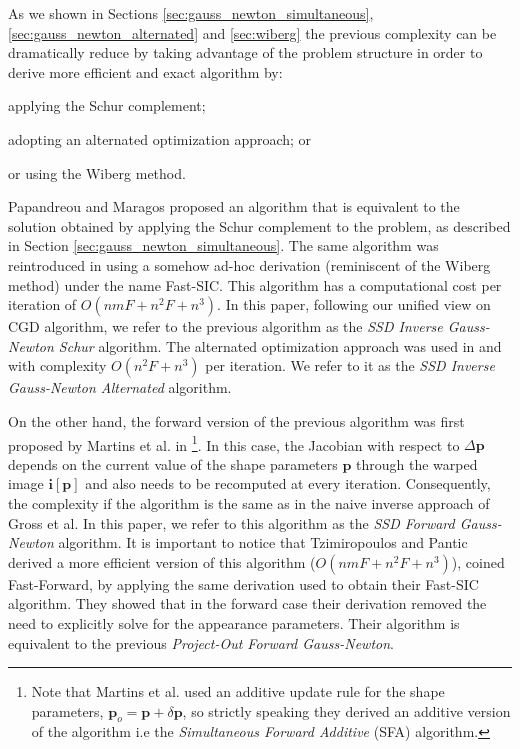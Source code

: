 As we shown in Sections \ref{sec:gauss_newton_simultaneous}, \ref{sec:gauss_newton_alternated} and \ref{sec:wiberg} the previous complexity can be dramatically reduce by taking advantage of the problem structure in order to derive more efficient and exact algorithm by:
\begin{inparaenum}
\item applying the Schur complement;
\item adopting an alternated optimization approach; or
\item or using the Wiberg method.
\end{inparaenum}
Papandreou and Maragos \cite{Papandreou2008} proposed an algorithm that is equivalent to the solution obtained by applying the Schur complement to the problem, as described in Section \ref{sec:gauss_newton_simultaneous}. The same algorithm was reintroduced in \cite{Tzimiropoulos2013} using a somehow ad-hoc derivation (reminiscent of the Wiberg method) under the name Fast-SIC. This algorithm has a computational cost per iteration of $O(nmF + n^2F + n^3)$. In this paper, following our unified view on CGD algorithm, we refer to the previous algorithm as the \emph{SSD Inverse Gauss-Newton Schur} algorithm. The alternated optimization approach was used in \cite{Tzimiropoulos2012} and \cite{Antonakos2014} with complexity $O(n^2F + n^3)$ per iteration. We refer to it as the \emph{SSD Inverse Gauss-Newton Alternated} algorithm.

On the other hand, the forward version of the previous algorithm was first proposed by Martins et al. in \cite{Martins2010}\footnote{Note that Martins et al.  used an additive update rule for the shape parameters, $\mathbf{p}_o =  \mathbf{p} + \delta\mathbf{p}$, so strictly speaking they derived an additive version of the algorithm i.e the \emph{Simultaneous Forward Additive} (SFA) algorithm.}. In this case, the Jacobian with respect to $\Delta\mathbf{p}$ depends on the current value of the shape parameters $\mathbf{p}$ through the warped image $\mathbf{i}[\mathbf{p}]$ and also needs to be recomputed at every iteration. Consequently, the complexity if the algorithm is the same as in the naive inverse approach of Gross et al. In this paper, we refer to this algorithm as the \emph{SSD Forward Gauss-Newton} algorithm. It is important to notice that Tzimiropoulos and Pantic \cite{Tzimiropoulos2013} derived a more efficient version of this algorithm ($O(nmF + n^2F + n^3)$), coined Fast-Forward, by applying the same derivation used to obtain their Fast-SIC algorithm. They showed that in the forward case their derivation removed the need to explicitly solve for the appearance parameters. Their algorithm is equivalent to the previous \emph{Project-Out Forward Gauss-Newton}.

